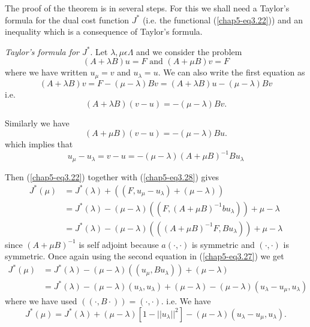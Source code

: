 The proof of the theorem is in several steps. For this we shall need a Taylor's formula for the dual cost function $J^{*}$ (i.e. the functional (\ref{chap5-eq3.22})) and an inequality which is a consequence of Taylor's formula.

{\em Taylor's formula for $J^{*}$}. Let $\lambda, \mu \epsilon \Lambda$ and we consider the problem 
\begin{equation*}
(A + \lambda B)u = F \text{ and } (A + \mu B)v = F\tag{3.27}\label{chap5-eq3.27}
\end{equation*}
where we have written $u_{\mu} = v$ and $u_{\lambda} = u$. We can also write the first equation as 
$$
(A + \lambda B)v = F - (\mu - \lambda) Bv = (A + \lambda B)u - (\mu - \lambda) Bv
$$
i.e. 
$$
(A + \lambda B)(v-u) = -(\mu - \lambda)Bv.
$$

Similarly we have
$$
(A + \mu B) (v-u) = -(\mu - \lambda)Bu.
$$
which implies that
\begin{equation*}
u_{\mu} - u_{\lambda} = v-u = -(\mu - \lambda)(A + \mu B)^{-1} Bu_{\lambda}\tag{3.28}\label{chap5-eq3.28}
\end{equation*}

Then (\ref{chap5-eq3.22}) together with (\ref{chap5-eq3.28}) gives
\begin{align*}
J^{*} (\mu) & = J^{*} (\lambda) + ((F, u_{\mu} - u_{\lambda}) + (\mu - \lambda))\\
& = J^{*} (\lambda) - (\mu - \lambda) ((F, (A + \mu B)^{-1} b u_{\lambda})) + \mu - \lambda\\
& = J^{*} (\lambda) - (\mu - \lambda)(((A + \mu B)^{-1} F, B u_{\lambda})) + \mu - \lambda
\end{align*}\pageoriginale
since $(A + \mu B)^{-1}$ is self adjoint because $a(\cdot ,  \cdot)$ is symmetric and $(\cdot , \cdot)$ is symmetric. Once again using the second equation in (\ref{chap5-eq3.27}) we get
\begin{align*}
J^{*}(\mu) & = J^{*} (\lambda)- (\mu - \lambda)((u_{\mu}, B u_{\lambda})) + (\mu - \lambda)\\
& = J^{*}(\lambda) - (\mu - \lambda) (u_{\lambda}, u_{\lambda}) + (\mu - \lambda) - (\mu- \lambda)(u_{\lambda}-u_{\mu}, u_{\lambda})
\end{align*}
where we have used $((\cdot , B \cdot)) = (\cdot , \cdot)$. i.e. We have
\begin{equation*}
J^{*}(\mu) = J^{*}(\lambda) + (\mu - \lambda) [1 - ||u_{\lambda}||^{2}] - (\mu - \lambda)(u_{\lambda}-u_{\mu}, u_{\lambda}).\tag{3.29}\label{chap5-eq3.29}
\end{equation*}

